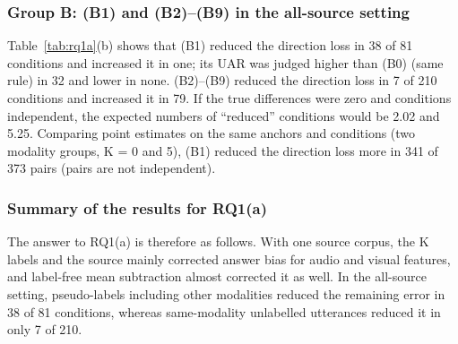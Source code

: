 \subsubsection{Group B: (B1) and (B2)--(B9) in the all-source setting}\label{sec:rq1a-all}
Table~\ref{tab:rq1a}(b) shows that (B1) reduced the direction loss in 38 of 81 conditions and increased it in one; its UAR was judged higher than (B0) (same rule) in 32 and lower in none. (B2)--(B9) reduced the direction loss in 7 of 210 conditions and increased it in 79. If the true differences were zero and conditions independent, the expected numbers of ``reduced'' conditions would be 2.02 and 5.25. Comparing point estimates on the same anchors and conditions (two modality groups, K = 0 and 5), (B1) reduced the direction loss more in 341 of 373 pairs (pairs are not independent).

\subsubsection{Summary of the results for RQ1(a)}
The answer to RQ1(a) is therefore as follows. With one source corpus, the K labels and the source mainly corrected answer bias for audio and visual features, and label-free mean subtraction almost corrected it as well. In the all-source setting, pseudo-labels including other modalities reduced the remaining error in 38 of 81 conditions, whereas same-modality unlabelled utterances reduced it in only 7 of 210.

